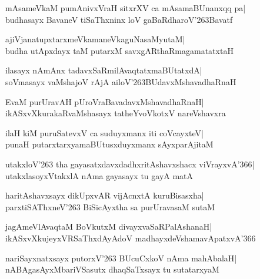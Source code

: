 \documentclass[twoside,12pt,openright]{book}
\def\S{\char'263}
\newcounter{shloka}[chapter]
\begin{document}
\begin{shloka}%
mAsameVkaM pumAnivxVraH sitxrXV ca mAsamaBUnanxqq pa|\\
budhasayx BavaneV tiSaThxninx loV gaBaRdharoV\S Bavatf
\end{shloka}

\begin{shloka}%
ajiVjanatupxtarxmeVkamaneVkaguNasaMyutaM|\\
budha utApxdayx taM putarxM savxgARthaRmagamatatxtaH
\end{shloka}

\begin{shloka}%
ilasayx nAmAnx tadavxSaRmilAvaqtatxmaBUtatxdA|\\
soVmasayx vaMshajoV rAjA ailoV\S BUdavxMshavadhaRnaH
\end{shloka}

\begin{shloka}%
EvaM purUravAH pUroVraBavadavxMshavadhaRnaH|\\
ikASxvXkurakaRvaMshasayx tatheYvoVkotxV nareVshavxra
\end{shloka}

\begin{shloka}%
ilaH kiM puruSatevxV ca suduyxmanx iti coVcayxteV|\\
punaH putarxtarxyamaBUtusxduyxmanx sAyxparAjitaM
\end{shloka}

\begin{shloka}%
utakxloV\char'263 tha gayasatxdavxdadhxritAshavxshacx
viVrayxvA\char'366|\\
utakxlasoyxVtakxlA nAma gayasayx tu gayA matA
\end{shloka}

\begin{shloka}%
haritAshavxsayx dikUpxvAR vijAcnxtA kuruBisasxha|\\
parxtiSAThxneV\char'263 BiSicAyxtha sa purUravasaM sutaM
\end{shloka}

\begin{shloka}%
jagAmeVlAvaqtaM BoVkutxM divayxvaSaRPalAshanaH|\\
ikASxvXkujeyxVRSaThxdAyAdoV madhayxdeVshamavApatxvA\char'366
\end{shloka}

\begin{shloka}%
nariSayxnatxsayx putorxV\char'263 BUcuCxkoV nAma mahAbalaH|\\
nABAgasAyxMbariVSasutx dhaqSaTxsayx tu sutatarxyaM
\end{shloka}
\end{document}
